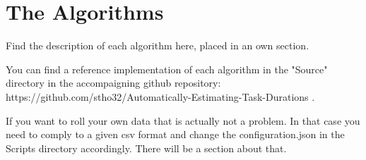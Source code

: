 \newpage{}

\section{The Algorithms}

Find the description of each algorithm here, 
placed in an own section. 

You can find a reference implementation 
of each algorithm in the "Source" directory 
in the accompaigning github repository: 
https://github.com/stho32/Automatically-Estimating-Task-Durations .

If you want to roll your own data that 
is actually not a problem.
In that case you need to comply to a 
given csv format and change the 
configuration.json in the Scripts directory
accordingly. 
There will be a section about that. 


